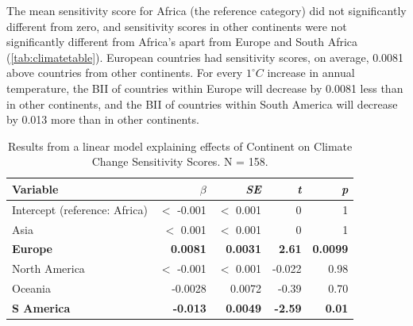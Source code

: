 \documentclass[11pt, a4paper, titlepage]{article}
\begin{document}
	The mean sensitivity score for Africa (the reference category) did not significantly different from zero, and sensitivity scores in other continents were not significantly different from Africa's apart from Europe and South Africa (\autoref{tab:climatetable}). European countries had sensitivity scores, on average, 0.0081 above countries from other continents. For every $1^\circ C$ increase in annual temperature, the BII of countries within Europe will decrease by 0.0081 less than in other continents, and the BII of countries within South America will decrease by 0.013 more than in other continents. 
	
	
	
	\newpage
	
	\begin{table}[h!]
		\begin{center}
			\caption{Results from a linear model explaining effects of Continent on Climate Change Sensitivity Scores. \textmd{N = 158.}}
			\label{tab:climatetable}
			\begin{tabular}{l|r|r|r|r}
				Variable & $\beta$ & \textit{SE} & \textit{t} & \textit{p}\\
				\hline
				Intercept (reference: Africa) & $<$ -0.001 & $<$ 0.001 & 0 & 1\\
				Asia & $<$ 0.001 & $<$ 0.001& 0 & 1\\
				\textbf{Europe} & \textbf{0.0081} & \textbf{0.0031} & \textbf{2.61} & \textbf{0.0099} \\
				North America & $<$ -0.001 & $<$ 0.001 & -0.022 & 0.98\\
				Oceania & -0.0028 & 0.0072 & -0.39 & 0.70\\
				\textbf{S America} & \textbf{-0.013} & \textbf{0.0049} & \textbf{-2.59} & \textbf{0.01}\\
			\end{tabular}
		\end{center}
	\end{table}
	
\end{document}
